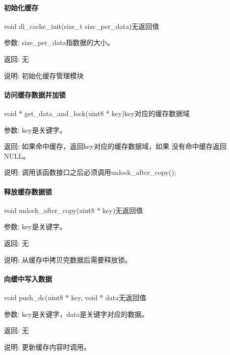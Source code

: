 \paragraph{初始化缓存}
{void dl\_cache\_init(size\_t size\_per\_data)}{无返回值}
	\begin{compactdesc}
	\item[参数:]size\_per\_data指数据的大小。
	\item[返回:]无
	\item[说明:]初始化缓存管理模块
	\end{compactdesc}

\paragraph{访问缓存数据并加锁}
{void * get\_data\_and\_lock(uint8 * key)}{key对应的缓存数据域}
	\begin{compactdesc}
	\item[参数:]key是关键字。
	\item[返回:]如果命中缓存，返回key对应的缓存数据域，如果
	没有命中缓存返回NULL。
	\item[说明:]调用该函数接口之后必须调用unlock\_after\_copy();
	\end{compactdesc}
	
\paragraph{释放缓存数据锁}
{void unlock\_after\_copy(uint8 * key)}{无返回值}
	\begin{compactdesc}
	\item[参数:]key是关键字。
	\item[返回:]无
	\item[说明:]从缓存中拷贝完数据后需要释放锁。
	\end{compactdesc}
	
\paragraph{向缓中写入数据}
{void push\_dc(uint8 * key, void * data}{无返回值}
	\begin{compactdesc}
	\item[参数:]key是关键字，data是关键字对应的数据。
	\item[返回:]无
	\item[说明:]更新缓存内容时调用。
	\end{compactdesc}

%
